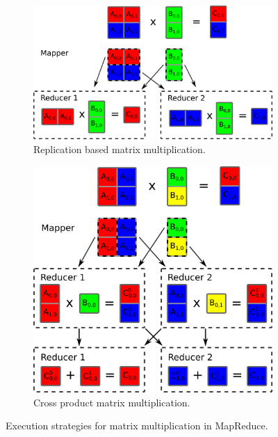 \begin{figure}[h!]
	\centering
	\begin{subfigure}{.43\linewidth}
		\centering
		\includegraphics[width=0.99\linewidth]{images/rmm.png}
		\caption{Replication based matrix multiplication.}
		\label{fig:RMM}
	\end{subfigure}
	\hfill
	\begin{subfigure}{.43\linewidth}
		\centering
		\includegraphics[width=0.8\linewidth]{images/cpmm.png}
		\caption{Cross product matrix multiplication.}
		\label{fig:CPMM}
	\end{subfigure}
	\caption{Execution strategies for matrix multiplication in MapReduce.}
	\label{fig:MMs}
\end{figure}


